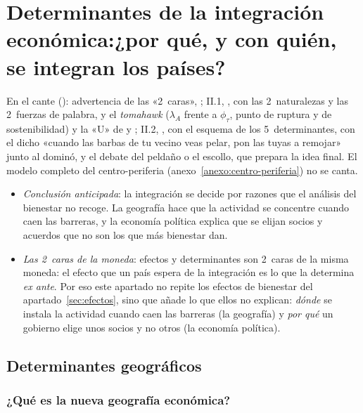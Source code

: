 \documentclass[11pt]{article}
\begin{document}
\section{Determinantes de la integración económica:\newline ¿por qué, y con quién, se integran los países?}\label{sec:determinantes}

\begin{notaopositor}
En el cante (): advertencia de las «2~caras», ; II.1, , con las 2~naturalezas y las 2~fuerzas de palabra, y el \emph{tomahawk} ($\lambda_A$ frente a $\phi_\tau$, punto de ruptura y de sostenibilidad) y la «U» de  y ; II.2, , con el esquema de los 5~determinantes, con el dicho «cuando las barbas de tu vecino veas pelar, pon las tuyas a remojar» junto al dominó, y el debate del peldaño o el escollo, que prepara la idea final. El modelo completo del centro-periferia (anexo~\ref{anexo:centro-periferia}) no se canta.
\end{notaopositor}

\begin{itemize}
\item \emph{Conclusión anticipada}: la integración se decide por razones que el análisis del bienestar no recoge. La geografía hace que la actividad se concentre cuando caen las barreras, y la economía política explica que se elijan socios y acuerdos que no son los que más bienestar dan.
\item \emph{Las 2~caras de la moneda}: efectos y determinantes son 2~caras de la misma moneda: el efecto que un país espera de la integración es lo que la determina \emph{ex ante}. Por eso este apartado no repite los efectos de bienestar del apartado~\ref{sec:efectos}, sino que añade lo que ellos no explican: \emph{dónde} se instala la actividad cuando caen las barreras (la geografía) y \emph{por qué} un gobierno elige unos socios y no otros (la economía política).
\end{itemize}

\subsection{Determinantes geográficos}\label{sec:geograficos}

\subsubsection{¿Qué es la nueva geografía económica?}\label{sec:nge}
\end{document}
